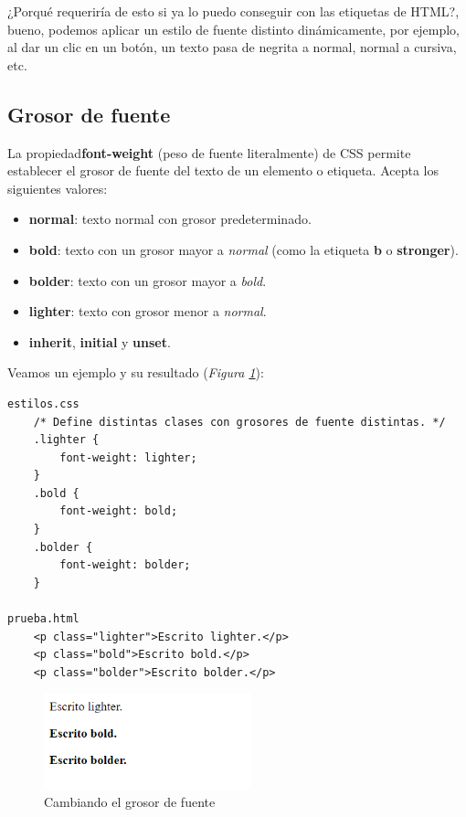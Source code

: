 ¿Porqué requeriría de esto si ya lo puedo conseguir con las etiquetas de HTML?, bueno, podemos aplicar un estilo de fuente distinto dinámicamente, por ejemplo, al dar un clic en un botón, un texto pasa de negrita a normal, normal a cursiva, etc.


\subsection{Grosor de fuente}

La propiedad\textbf{font-weight} (peso de fuente literalmente) de CSS permite establecer el grosor de fuente del texto de un elemento o etiqueta. Acepta los siguientes valores:
\begin{itemize}
    \item \textbf{normal}: texto normal con grosor predeterminado.
    \item \textbf{bold}: texto con un grosor mayor a \textit{normal} (como la etiqueta \textbf{b} o \textbf{stronger}).
    \item \textbf{bolder}: texto con un grosor mayor a \textit{bold}.
    \item \textbf{lighter}: texto con grosor menor a \textit{normal}.
    \item \textbf{inherit}, \textbf{initial} y \textbf{unset}.
\end{itemize}

Veamos un ejemplo y su resultado (\textit{Figura \ref{fig: 6}}):
\begin{lstlisting}
estilos.css
    /* Define distintas clases con grosores de fuente distintas. */
    .lighter {   
        font-weight: lighter;
    }
    .bold {   
        font-weight: bold;
    }
    .bolder {
        font-weight: bolder;
    }

prueba.html
    <p class="lighter">Escrito lighter.</p>
    <p class="bold">Escrito bold.</p>
    <p class="bolder">Escrito bolder.</p>
\end{lstlisting}
\begin{figure}[H]
    \centering
    \caption{Cambiando el grosor de fuente}
    \label{fig: 6}
    \includegraphics[width=6cm]{ss/fuentes-weight.png}
\end{figure}

